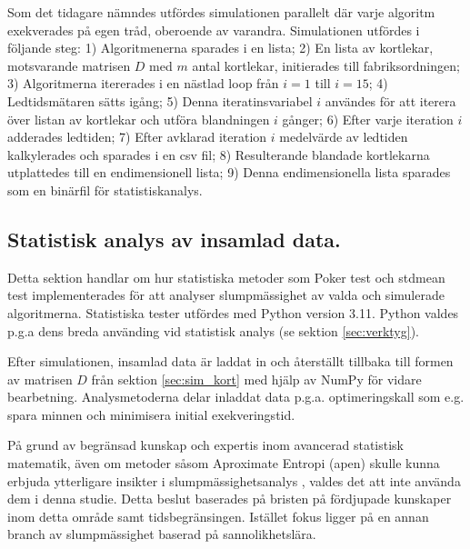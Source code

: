 \documentclass[swedish,a4paper]{article}
\begin{document}
Som det tidagare nämndes utfördes simulationen parallelt där varje algoritm
exekverades på egen tråd, oberoende av varandra.
Simulationen utfördes i följande steg: 
1) Algoritmenerna sparades i en lista;
2) En lista av kortlekar, motsvarande matrisen $D$ med $m$ antal kortlekar, initierades till fabriksordningen; 
3) Algoritmerna itererades i en nästlad loop från $i = 1$ till $i = 15$; 
4) Ledtidsmätaren sätts igång;
5) Denna iteratinsvariabel $i$ användes för att iterera över listan av kortlekar
och utföra blandningen $i$ gånger;
6) Efter varje iteration $i$ adderades ledtiden;
7) Efter avklarad iteration $i$ medelvärde av ledtiden kalkylerades och
sparades i en csv fil;
8) Resulterande blandade kortlekarna utplattedes till en endimensionell lista;
9) Denna endimensionella lista sparades som en binärfil för statistiskanalys.

%


\subsection{Statistisk analys av insamlad data.}
Detta sektion handlar om hur statistiska metoder som Poker test och
\gls{stdmean} test implementerades för att analyser slumpmässighet av valda och
simulerade algoritmerna. Statistiska tester utfördes med Python version 3.11.
Python valdes p.g.a dens breda använding vid statistisk analys (se sektion
\ref{sec:verktyg}).

Efter simulationen, insamlad data är laddat in och återställt tillbaka till
formen av matrisen $D$ från sektion \ref{sec:sim_kort} med hjälp av NumPy för vidare
bearbetning. Analysmetoderna delar inladdat data p.g.a. optimeringskall som e.g.
spara minnen och minimisera initial exekveringstid.

På grund av begränsad kunskap och expertis inom avancerad statistisk matematik,
även om metoder såsom Aproximate Entropi (\gls{apen}) skulle kunna erbjuda
ytterligare insikter i slumpmässighetsanalys \parencite{ApEn}, valdes det att
inte använda dem i denna studie. Detta beslut baserades på bristen på fördjupade
kunskaper inom detta område samt tidsbegränsingen. Istället fokus ligger på en
annan branch av slumpmässighet baserad på
sannolikhetslära. %
\end{document}
